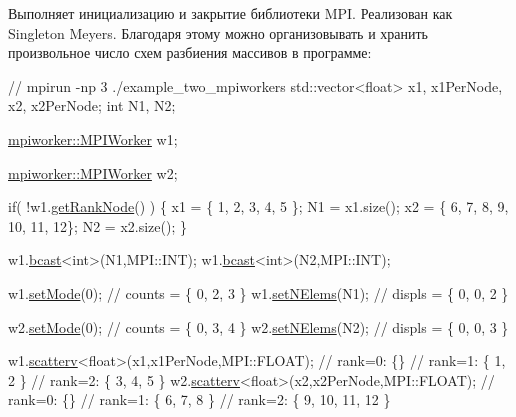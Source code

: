 Выполняет инициализацию и закрытие библиотеки M\-P\-I. Реализован как Singleton Meyers. Благодаря этому можно организовывать и хранить произвольное число схем разбиения массивов в программе\-: 
\begin{DoxyCode}
                                                \textcolor{comment}{// mpirun -np 3 ./example\_two\_mpiworkers}
std::vector<float> x1, x1PerNode,
                   x2, x2PerNode;
\textcolor{keywordtype}{int} N1, N2;

\hyperlink{classmpiworker_1_1MPIWorker}{mpiworker::MPIWorker} w1;                

\hyperlink{classmpiworker_1_1MPIWorker}{mpiworker::MPIWorker} w2;

\textcolor{keywordflow}{if}( !w1.\hyperlink{classmpiworker_1_1MPIWorker_acbd3bd07d15ffa90a2c112edeecee6e0}{getRankNode}() ) 
\{
    x1 = \{ 1, 2, 3, 4, 5 \}; 
    N1 = x1.size();
    x2 = \{ 6, 7, 8, 9, 10, 11, 12\};
    N2 = x2.size();
\}


w1.\hyperlink{classmpiworker_1_1MPIWorker_ae22bafa8bd4d6515e5b91ef95518c87d}{bcast}<\textcolor{keywordtype}{int}>(N1,MPI::INT);
w1.\hyperlink{classmpiworker_1_1MPIWorker_ae22bafa8bd4d6515e5b91ef95518c87d}{bcast}<\textcolor{keywordtype}{int}>(N2,MPI::INT);

w1.\hyperlink{classmpiworker_1_1MPIWorker_a2ff88f266efae23ec2a12a56bd0472d1}{setMode}(0);                                  \textcolor{comment}{// counts = \{ 0, 2, 3 \}}
w1.\hyperlink{classmpiworker_1_1MPIWorker_afcce321227c6d15a5fc2145cf59cd54d}{setNElems}(N1);                               \textcolor{comment}{// displs = \{ 0, 0, 2 \}}

w2.\hyperlink{classmpiworker_1_1MPIWorker_a2ff88f266efae23ec2a12a56bd0472d1}{setMode}(0);                                  \textcolor{comment}{// counts = \{ 0, 3, 4 \}}
w2.\hyperlink{classmpiworker_1_1MPIWorker_afcce321227c6d15a5fc2145cf59cd54d}{setNElems}(N2);                               \textcolor{comment}{// displs = \{ 0, 0, 3 \}}

w1.\hyperlink{classmpiworker_1_1MPIWorker_a24f713941043ab8d54574830a251995b}{scatterv}<\textcolor{keywordtype}{float}>(x1,x1PerNode,MPI::FLOAT);    \textcolor{comment}{// rank=0: \{\}}
                                                \textcolor{comment}{// rank=1: \{ 1, 2 \}}
                                                \textcolor{comment}{// rank=2: \{ 3, 4, 5 \}}
w2.\hyperlink{classmpiworker_1_1MPIWorker_a24f713941043ab8d54574830a251995b}{scatterv}<\textcolor{keywordtype}{float}>(x2,x2PerNode,MPI::FLOAT);    \textcolor{comment}{// rank=0: \{\}}
                                                \textcolor{comment}{// rank=1: \{ 6, 7, 8 \}}
                                                \textcolor{comment}{// rank=2: \{ 9, 10, 11, 12 \}}
\end{DoxyCode}


